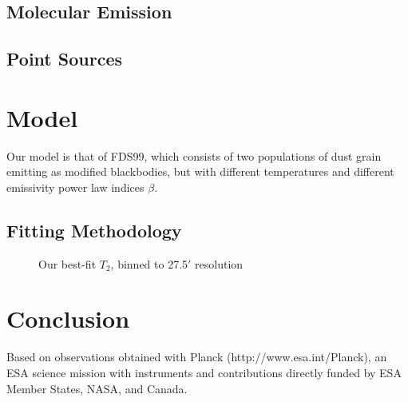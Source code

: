 \documentclass{emulateapj}
\begin{document}
\subsection{Molecular Emission}

\subsection{Point Sources}

\section{Model}
Our model is that of FDS99, which consists of two populations of dust 
grain emitting as modified blackbodies, but with different temperatures
and different emissivity power law indices $\beta$.


\subsection{Fitting Methodology}

\begin{figure*}[ht]
\begin{center}
\caption{Our best-fit $T_2$, binned to 27.5$'$ resolution}
\end{center}
\end{figure*}

\section{Conclusion}

Based on observations obtained with Planck (http://www.esa.int/Planck), 
an ESA science mission with instruments and contributions directly funded 
by ESA Member States, NASA, and Canada.



\end{document}
